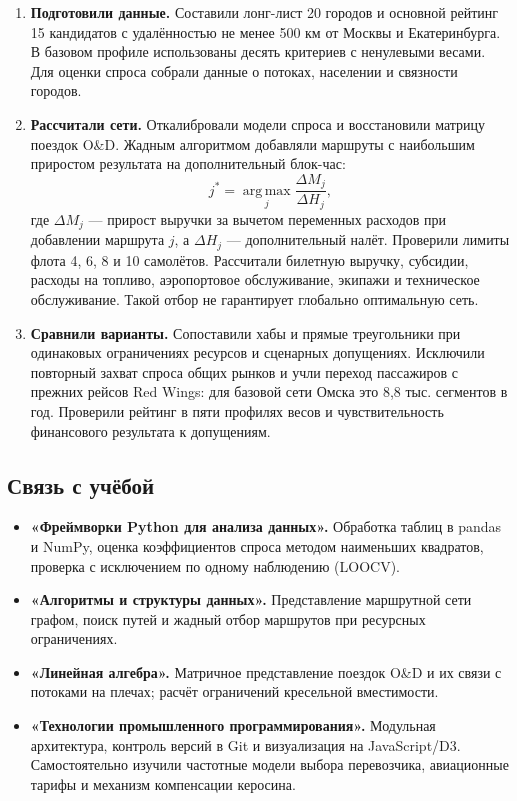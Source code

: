 \documentclass[11pt,a4paper]{article}
\begin{document}
\begin{enumerate}
    \item \textbf{Подготовили данные.} Составили лонг-лист 20 городов
    и основной рейтинг 15 кандидатов с удалённостью не менее 500 км
    от Москвы и Екатеринбурга. В базовом профиле использованы десять
    критериев с ненулевыми весами. Для оценки спроса собрали данные
    о потоках, населении и связности городов.
    \item \textbf{Рассчитали сети.} Откалибровали модели спроса
    и восстановили матрицу поездок O\&D. Жадным алгоритмом добавляли
    маршруты с наибольшим приростом результата на дополнительный блок-час:
    \[
        j^*=\operatorname*{arg\,max}_{j}
        \frac{\Delta M_j}{\Delta H_j},
    \]
    где $\Delta M_j$ --- прирост выручки за вычетом переменных расходов
    при добавлении маршрута $j$, а $\Delta H_j$ --- дополнительный налёт.
    Проверили лимиты флота 4, 6, 8 и 10 самолётов. Рассчитали билетную
    выручку, субсидии, расходы на топливо, аэропортовое обслуживание,
    экипажи и техническое обслуживание. Такой отбор не гарантирует
    глобально оптимальную сеть.
    \item \textbf{Сравнили варианты.} Сопоставили хабы и прямые
    треугольники при одинаковых ограничениях ресурсов и сценарных
    допущениях. Исключили повторный захват спроса общих рынков и учли
    переход пассажиров с прежних рейсов Red Wings: для базовой сети Омска
    это 8,8 тыс. сегментов в год. Проверили рейтинг в пяти профилях весов
    и чувствительность финансового результата к допущениям.
\end{enumerate}

\subsection*{Связь с учёбой}

\begin{itemize}
    \item \textbf{«Фреймворки Python для анализа данных».}
    Обработка таблиц в pandas и NumPy, оценка коэффициентов спроса
    методом наименьших квадратов, проверка с исключением
    по одному наблюдению (LOOCV).
    \item \textbf{«Алгоритмы и структуры данных».}
    Представление маршрутной сети графом, поиск путей и жадный отбор
    маршрутов при ресурсных ограничениях.
    \item \textbf{«Линейная алгебра».}
    Матричное представление поездок O\&D и их связи с потоками на плечах;
    расчёт ограничений кресельной вместимости.
    \item \textbf{«Технологии промышленного программирования».}
    Модульная архитектура, контроль версий в Git и визуализация
    на JavaScript/D3. Самостоятельно изучили частотные модели выбора
    перевозчика, авиационные тарифы и механизм компенсации керосина.
\end{itemize}
\end{document}
